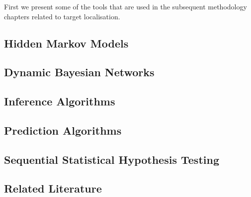 

First we present some of the tools that are used in the subsequent methodology chapters related to target localisation. 


\subsection{Hidden Markov Models}


\subsection{Dynamic Bayesian Networks}


\subsection{Inference Algorithms}


\subsection{Prediction Algorithms}


\subsection{Sequential Statistical Hypothesis Testing}


\subsection{Related Literature}
